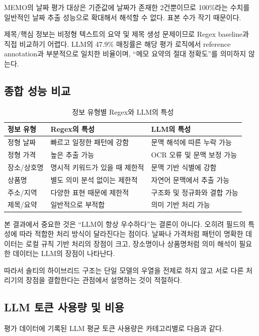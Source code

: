 \documentclass[11pt,a4paper]{article}
\begin{document}
MEMO의 날짜 평가 대상은 기준값에 날짜가 존재한 2건뿐이므로 100\%라는 수치를 일반적인 날짜 추출 성능으로 확대해서 해석할 수 없다. 표본 수가 작기 때문이다.

제목/핵심 정보는 비정형 텍스트의 요약 및 제목 생성 문제이므로 Regex baseline과 직접 비교하기 어렵다. LLM의 47.9\% 매칭률은 해당 평가 로직에서 reference annotation과 부분적으로 일치한 비율이며, ``메모 요약의 절대 정확도''를 의미하지 않는다.

\subsection{종합 성능 비교}

\begin{table}[H]
\centering
\small
\begin{tabularx}{\linewidth}{l Y Y}
\toprule
\textbf{정보 유형} & \textbf{Regex의 특성} & \textbf{LLM의 특성}\\
\midrule
정형 날짜 & 빠르고 일정한 패턴에 강함 & 문맥 해석에 따른 누락 가능\\
정형 가격 & 높은 추출 가능 & OCR 오류 및 문맥 보정 가능\\
장소/상호명 & 명시적 키워드가 있을 때 제한적 & 문맥 기반 식별에 강함\\
상품명 & 별도 의미 분석 없이는 제한적 & 자연어 문맥에서 추출 가능\\
주소/지역 & 다양한 표현 때문에 제한적 & 구조화 및 정규화와 결합 가능\\
제목/요약 & 일반적으로 부적합 & 의미 기반 처리 가능\\
\bottomrule
\end{tabularx}
\caption{정보 유형별 Regex와 LLM의 특성}
\end{table}

본 결과에서 중요한 것은 ``LLM이 항상 우수하다''는 결론이 아니다. 오히려 필드의 특성에 따라 적합한 처리 방식이 달라진다는 점이다. 날짜나 가격처럼 패턴이 명확한 데이터는 로컬 규칙 기반 처리의 장점이 크고, 장소명이나 상품명처럼 의미 해석이 필요한 데이터는 LLM의 장점이 나타난다.

따라서 솔티의 하이브리드 구조는 단일 모델의 우열을 전제로 하지 않고 서로 다른 처리기의 장점을 결합한다는 관점에서 설명하는 것이 적절하다.

\subsection{LLM 토큰 사용량 및 비용}

평가 데이터에 기록된 LLM 평균 토큰 사용량은 카테고리별로 다음과 같다.
\end{document}
